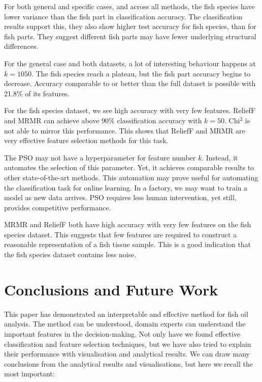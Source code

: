 \documentclass[runningheads]{llncs}
\begin{document}
For both general and specific cases, and across all methods, the fish species have lower variance than the fish part in classification accuracy.
The classification results support this, they also show higher test accuracy for fish species, than for fish parts.
They suggest different fish parts may have fewer underlying structural differences.

For the general case and both datasets, a lot of interesting behaviour happens at $k=1050$.
The fish species reach a plateau, but the fish part accuracy begins to decrease.
Accuracy comparable to or better than the full dataset is possible with 21.8\% of its features.

For the fish species dataset, we see high accuracy with very few features.
ReliefF and MRMR can achieve above 90\% classification accuracy with $k = 50$.
Chi$^2$ is not able to mirror this performance.
This shows that ReliefF and MRMR are very effective feature selection methods for this task.

The PSO may not have a hyperparameter for feature number $k$.
Instead, it automates the selection of this parameter.
Yet, it achieves comparable results to other state-of-the-art methods.
This automation may prove useful for automating the classification task for online learning.
In a factory, we may want to train a model as new data arrives.
PSO requires less human intervention, yet still, provides competitive performance.

MRMR and ReliefF both have high accuracy with very few features on the fish species dataset.
This suggests that few features are required to construct a reasonable representation of a fish tissue sample.
This is a good indication that the fish species dataset contains less noise.

\section{Conclusions and Future Work}

This paper has demonstrated an interpretable and effective method for fish oil analysis. 
The method can be understood, domain experts can understand the important features in the decision-making.
Not only have we found effective classification and feature selection techniques, but we have also tried to explain their performance with visualisation and analytical results. 
We can draw many conclusions from the analytical results and visualisations, but here we recall the most important:
\end{document}
